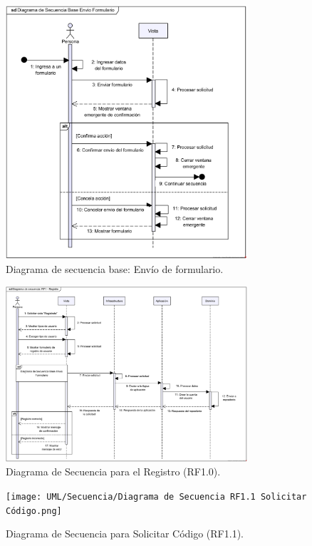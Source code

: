\begin{figure}[H]
    \centering
    \caption{Diagrama de secuencia base: Envío de formulario.}
    \includegraphics[width=0.8\textwidth]{UML/Secuencia/Diagrama de Secuencia Base Envio Formulario.png}
\end{figure}


\begin{figure}[H]
    \centering
    \caption{Diagrama de Secuencia para el Registro (RF1.0).}
 \includegraphics[width=0.8\textwidth]{UML/Secuencia/Diagrama de Secuencia RF1.0 Registro.png}
\end{figure}


\begin{figure}[H]
    \centering
    \caption{Diagrama de Secuencia para Solicitar Código (RF1.1).}
    \texttt{[image: UML/Secuencia/Diagrama de Secuencia RF1.1 Solicitar Código.png]}
\end{figure}


